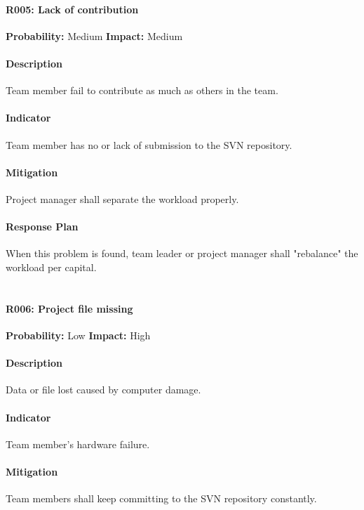 \documentclass[11pt, a4paper]{report}
\begin{document}
\pagebreak

	\paragraph{R005: Lack of contribution} \hspace{1cm} \textbf{Probability: }Medium\hspace{1cm}   \textbf{Impact: }Medium
	\paragraph{Description}Team member fail to contribute as much as others in the team.
	\paragraph{Indicator}Team member has no or lack of submission to the SVN repository. 
	\paragraph{Mitigation}Project manager shall separate the workload properly.
	\paragraph{Response Plan}When this problem is found, team leader or project manager shall "rebalance" the workload per capital. \\\\

	\paragraph{R006: Project file missing} \hspace{1cm} \textbf{Probability: }Low\hspace{1cm}   \textbf{Impact: }High
	\paragraph{Description}Data or file lost caused by computer damage.
	\paragraph{Indicator}Team member's hardware failure. 
	\paragraph{Mitigation}Team members shall keep committing to the SVN repository constantly.
\end{document}
